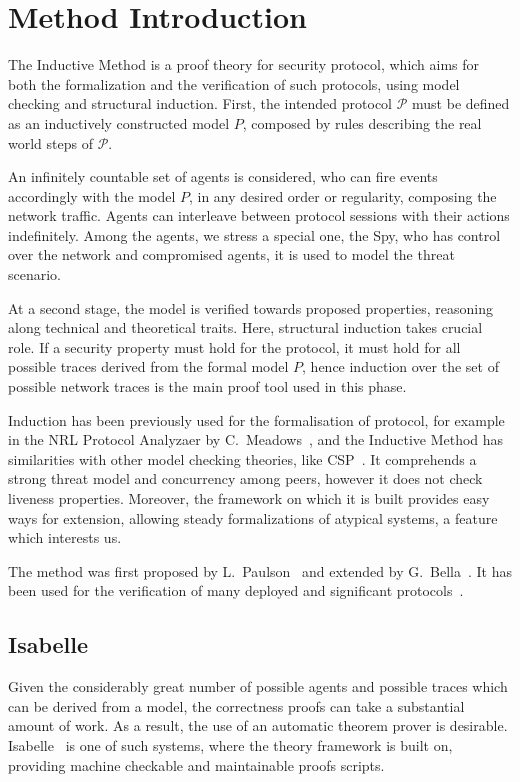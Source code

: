 \section{Method Introduction}\label{sec:inductive-method}
The Inductive Method is a proof theory for security protocol, which aims for both the formalization and the verification of such protocols, using model checking and structural induction. First, the intended protocol \(\mathcal{P}\) must be defined as an inductively constructed model \(P\), composed by rules describing the real world steps of \(\mathcal{P}\).

An infinitely countable set of agents is considered, who can fire events accordingly with the model \(P\), in any desired order or regularity, composing the network traffic. Agents can interleave between protocol sessions with their actions indefinitely. Among the agents, we stress a special one, the Spy, who has control over the network and compromised agents, it is used to model the threat scenario.

At a second stage, the model is verified towards proposed properties, reasoning along technical and theoretical traits. Here, structural induction takes crucial role. If a security property must hold for the protocol, it must hold for all possible traces derived from the formal model \(P\), hence induction over the set of possible network traces is the main proof tool used in this phase.

Induction has been previously used for the formalisation of protocol, for example in the NRL Protocol Analyzaer by C.~Meadows~\cite{Meadows96}, and the Inductive Method has similarities with other model checking theories, like CSP~\cite{RyanSchneider2010}. It comprehends a strong threat model and concurrency among peers, however it does not check liveness properties. Moreover, the framework on which it is built provides easy ways for extension, allowing steady formalizations of atypical systems, a feature which interests us.

The method was first proposed by L.~Paulson~\cite{Paulson98} and extended by G.~Bella~\cite{Bella2007}. It has been used for the verification of many deployed and significant protocols~\cite{Paulson99, BellaPaulson2006, Bella2003}.



\subsection{Isabelle}
Given the considerably great number of possible agents and possible traces which can be derived from a model, the correctness proofs can take a substantial amount of work. As a result, the use of an automatic theorem prover is desirable. Isabelle~\cite{isabelle} is one of such systems, where the theory framework is built on, providing machine checkable and maintainable proofs scripts.

